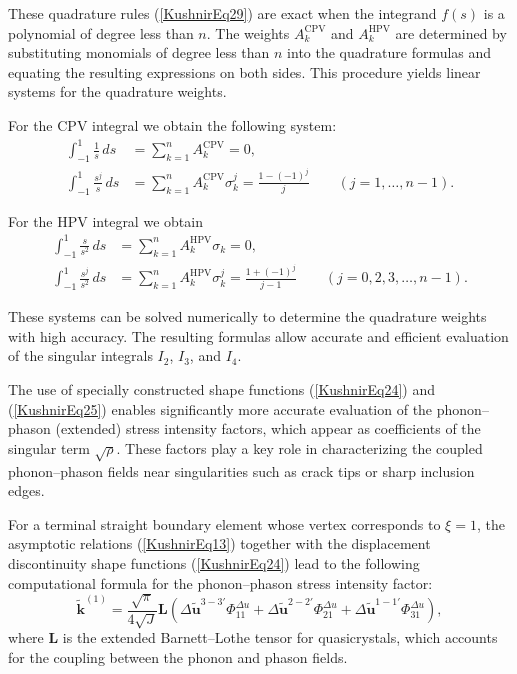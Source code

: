 These quadrature rules (\ref{KushnirEq29}) are exact when the integrand
$f(s)$ is a polynomial of degree less than $n$. The weights
$A_{k}^{\mathrm{CPV}}$ and $A_{k}^{\mathrm{HPV}}$ are determined by
substituting monomials of degree less than $n$ into the quadrature
formulas and equating the resulting expressions on both sides. This
procedure yields linear systems for the quadrature weights.

For the CPV integral we obtain the following system:
\begin{equation}
	\begin{aligned}
		\int_{-1}^{1}\frac{1}{s}\,ds
		&=
		\sum_{k=1}^{n}A_{k}^{\mathrm{CPV}}
		=
		0,
		\\
		\int_{-1}^{1}\frac{s^{j}}{s}\,ds
		&=
		\sum_{k=1}^{n}A_{k}^{\mathrm{CPV}}\sigma_{k}^{j}
		=
		\frac{1-(-1)^{j}}{j}
		\qquad
		(j=1,\ldots,n-1).
	\end{aligned}
	\label{KushnirEq30}
\end{equation}

For the HPV integral we obtain
\begin{equation}
	\begin{aligned}
		\int_{-1}^{1}\frac{s}{s^{2}}\,ds
		&=
		\sum_{k=1}^{n}A_{k}^{\mathrm{HPV}}\sigma_{k}
		=
		0,
		\\
		\int_{-1}^{1}\frac{s^{j}}{s^{2}}\,ds
		&=
		\sum_{k=1}^{n}A_{k}^{\mathrm{HPV}}\sigma_{k}^{j}
		=
		\frac{1+(-1)^{j}}{j-1}
		\qquad
		(j=0,2,3,\ldots,n-1).
	\end{aligned}
	\label{KushnirEq31}
\end{equation}

These systems can be solved numerically to determine the quadrature
weights with high accuracy. The resulting formulas allow accurate
and efficient evaluation of the singular integrals $I_{2}$, $I_{3}$,
and $I_{4}$.

The use of specially constructed shape functions
(\ref{KushnirEq24}) and (\ref{KushnirEq25}) enables significantly more
accurate evaluation of the phonon–phason (extended) stress intensity
factors, which appear as coefficients of the singular term
$\sqrt{\rho}$. These factors play a key role in characterizing the
coupled phonon–phason fields near singularities such as crack tips
or sharp inclusion edges.

For a terminal straight boundary element whose vertex corresponds to
$\xi=1$, the asymptotic relations (\ref{KushnirEq13}) together with
the displacement discontinuity shape functions
(\ref{KushnirEq24}) lead to the following computational formula for
the phonon–phason stress intensity factor:
\begin{equation}
	\tilde{\mathbf{k}}^{(1)}
	=
	\frac{\sqrt{\pi}}{4\sqrt{J}}
	\mathbf{L}
	\left(
	\Delta\tilde{\mathbf{u}}^{3-3'}\Phi_{11}^{\Delta u}
	+
	\Delta\tilde{\mathbf{u}}^{2-2'}\Phi_{21}^{\Delta u}
	+
	\Delta\tilde{\mathbf{u}}^{1-1'}\Phi_{31}^{\Delta u}
	\right),
	\label{KushnirEq32}
\end{equation}
where $\mathbf{L}$ is the extended Barnett–Lothe tensor for
quasicrystals, which accounts for the coupling between the phonon
and phason fields.

